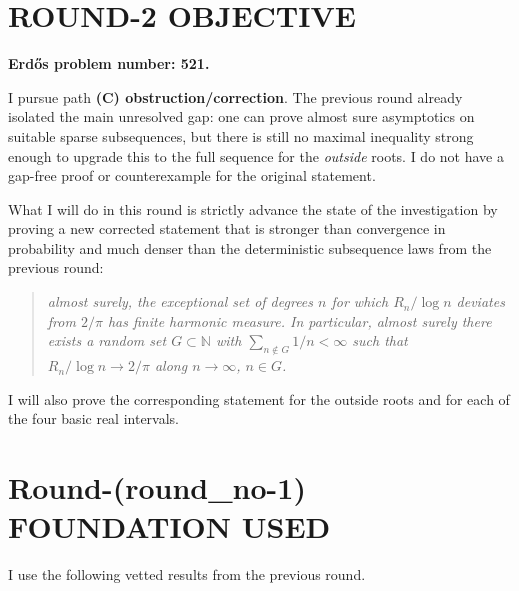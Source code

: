 \section{ROUND-2 OBJECTIVE}

\textbf{Erd\H{o}s problem number: 521.}

I pursue path \textbf{(C) obstruction/correction}. The previous round already isolated the main unresolved gap: one can prove almost sure asymptotics on suitable sparse subsequences, but there is still no maximal inequality strong enough to upgrade this to the full sequence for the \emph{outside} roots. I do not have a gap-free proof or counterexample for the original statement.

What I will do in this round is strictly advance the state of the investigation by proving a new corrected statement that is stronger than convergence in probability and much denser than the deterministic subsequence laws from the previous round:
\begin{quote}
\emph{almost surely, the exceptional set of degrees $n$ for which $R_n/\log n$ deviates from $2/\pi$ has finite harmonic measure. In particular, almost surely there exists a random set $G\subset\mathbb N$ with $\sum_{n\notin G}1/n<\infty$ such that $R_n/\log n\to 2/\pi$ along $n\to\infty$, $n\in G$.}
\end{quote}
I will also prove the corresponding statement for the outside roots and for each of the four basic real intervals.

\section{Round-(round\_no-1) FOUNDATION USED}

I use the following vetted results from the previous round.

